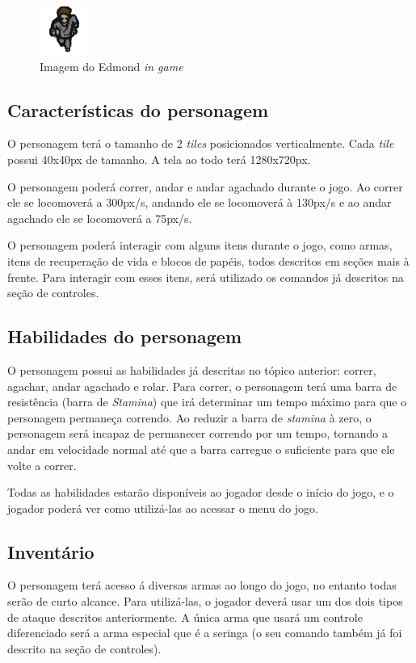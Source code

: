 \documentclass[12pt]{article}
\begin{document}
\begin{figure}[h]
    \centering
    \caption{Imagem do Edmond \textit{in game}}
     \includegraphics[keepaspectratio=true,scale=4]{images/e_ig.png}
\end{figure}
\subsection{Características do personagem}
O personagem terá o tamanho de 2 \textit{tiles} posicionados verticalmente. Cada \textit{tile} possui 40x40px de tamanho. A tela ao todo terá 1280x720px. 

O personagem poderá correr, andar e andar agachado durante o jogo. Ao correr ele se locomoverá a 300px/s, andando ele se locomoverá à 130px/s e ao andar agachado ele se locomoverá a 75px/s.

O personagem poderá interagir com alguns itens durante o jogo, como armas, itens de recuperação de vida e blocos de papéis, todos descritos em seções mais à frente. Para interagir com esses itens, será utilizado os comandos já descritos na seção de controles.

\subsection{Habilidades do personagem}
O personagem possui as habilidades já descritas no tópico anterior: correr, agachar, andar agachado e rolar. Para correr, o personagem terá uma barra de resistência (barra de \textit{Stamina}) que irá determinar um tempo máximo para que o personagem permaneça correndo. Ao reduzir a barra de \textit{stamina} à zero, o personagem será incapaz de permanecer correndo por um tempo, tornando a andar em velocidade normal até que a barra carregue o suficiente para que ele volte a correr.

Todas as habilidades estarão disponíveis ao jogador desde o início do jogo, e o jogador poderá ver como utilizá-las ao acessar  o menu do jogo.

\subsection{Inventário}
O personagem terá acesso á diversas armas ao longo do jogo, no entanto todas serão de curto alcance. Para utilizá-las, o jogador deverá usar um dos dois tipos de ataque descritos anteriormente. A única arma que usará um controle diferenciado será a arma especial que é a seringa (o seu comando também já foi descrito na seção de controles). 
\end{document}
